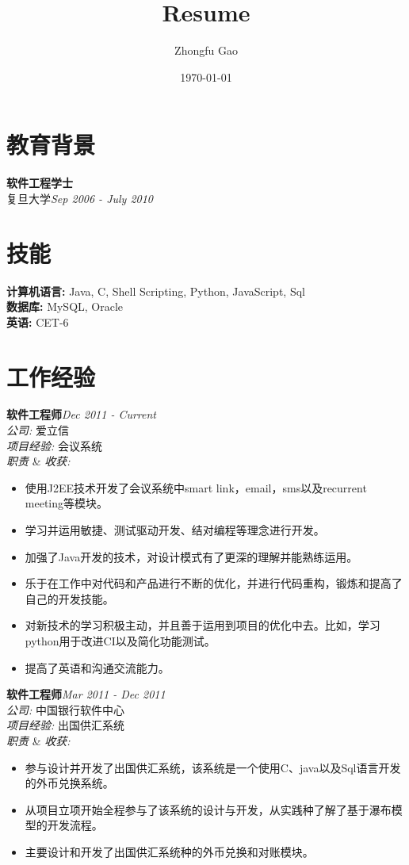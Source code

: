 \documentclass[line, margin, 12pt]{res}
\author{Zhongfu Gao}
\title{Resume}
\date{\today}
\begin{document}
\renewcommand{\namefont}{ \LARGE \bf } %
\address{{\bf 电子邮件: }joshuafufu@gmail.com}
\address{{\bf 移动电话: }(+86)15921928229}

\begin{resume}

\section{教育背景}
{\bf 软件工程学士}\\
复旦大学\hfill {\it Sep 2006 - July 2010}\\

\section{技能}
{\bf 计算机语言:} Java, C, Shell Scripting, Python, JavaScript, Sql \\
{\bf 数据库:} MySQL, Oracle\\
{\bf 英语:} CET-6

\section{工作经验}

{\bf 软件工程师}\hfill {\it Dec 2011 - Current}\\
{\sl 公司:} 爱立信\\
{\sl 项目经验:} 会议系统\\
{\sl 职责} \& {\sl 收获:}
\begin{itemize}
\item 使用J2EE技术开发了会议系统中smart link，email，sms以及recurrent meeting等模块。
\item 学习并运用敏捷、测试驱动开发、结对编程等理念进行开发。
\item 加强了Java开发的技术，对设计模式有了更深的理解并能熟练运用。
\item 乐于在工作中对代码和产品进行不断的优化，并进行代码重构，锻炼和提高了自己的开发技能。
\item 对新技术的学习积极主动，并且善于运用到项目的优化中去。比如，学习python用于改进CI以及简化功能测试。
\item 提高了英语和沟通交流能力。
\end{itemize}

{\bf 软件工程师}\hfill {\it Mar 2011 - Dec 2011}\\
{\sl 公司:} 中国银行软件中心\\
{\sl 项目经验:} 出国供汇系统\\
{\sl 职责} \& {\sl 收获:}
\begin{itemize}
\item 参与设计并开发了出国供汇系统，该系统是一个使用C、java以及Sql语言开发的外币兑换系统。
\item 从项目立项开始全程参与了该系统的设计与开发，从实践种了解了基于瀑布模型的开发流程。
\item 主要设计和开发了出国供汇系统种的外币兑换和对账模块。
\end{itemize}


\end{resume}
\end{document}
